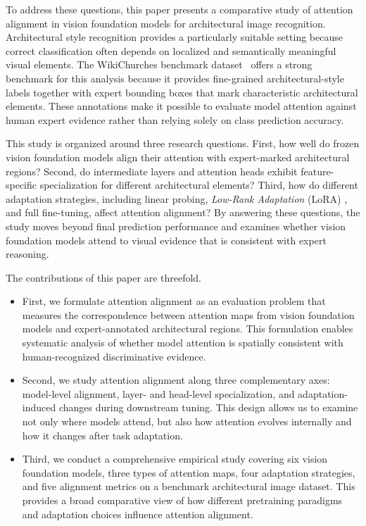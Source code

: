 \documentclass[lineno,pdflatex,sn-mathphys-num]{sn-jnl}%
\theoremstyle{thmstyleone}%
\theoremstyle{thmstyletwo}%
\theoremstyle{thmstylethree}%
\begin{document}
To address these questions, this paper presents a comparative study of attention alignment in vision foundation models for architectural image recognition. Architectural style recognition provides a particularly suitable setting because correct classification often depends on localized and semantically meaningful visual elements. The WikiChurches benchmark dataset~\cite{Barz21WikiChurches} offers a strong benchmark for this analysis because it provides fine-grained architectural-style labels together with expert bounding boxes that mark characteristic architectural elements. These annotations make it possible to evaluate model attention against human expert evidence rather than relying solely on class prediction accuracy.

This study is organized around three research questions. First, how well do frozen vision foundation models align their attention with expert-marked architectural regions? Second, do intermediate layers and attention heads exhibit feature-specific specialization for different architectural elements? Third, how do different adaptation strategies, including linear probing, \textit{Low-Rank Adaptation} (LoRA) \cite{hu2022lora}, and full fine-tuning, affect attention alignment? By answering these questions, the study moves beyond final prediction performance and examines whether vision foundation models attend to visual evidence that is consistent with expert reasoning.

The contributions of this paper are threefold.
\begin{itemize}
\item First, we formulate attention alignment as an evaluation problem that measures the correspondence between attention maps from vision foundation models and expert-annotated architectural regions. This formulation enables systematic analysis of whether model attention is spatially consistent with human-recognized discriminative evidence.
\item Second, we study attention alignment along three complementary axes: model-level alignment, layer- and head-level specialization, and adaptation-induced changes during downstream tuning. This design allows us to examine not only where models attend, but also how attention evolves internally and how it changes after task adaptation.
\item Third, we conduct a comprehensive empirical study covering six vision foundation models, three types of attention maps, four adaptation strategies, and five alignment metrics on a benchmark architectural image dataset. This provides a broad comparative view of how different pretraining paradigms and adaptation choices influence attention alignment.
\end{itemize}
\end{document}
